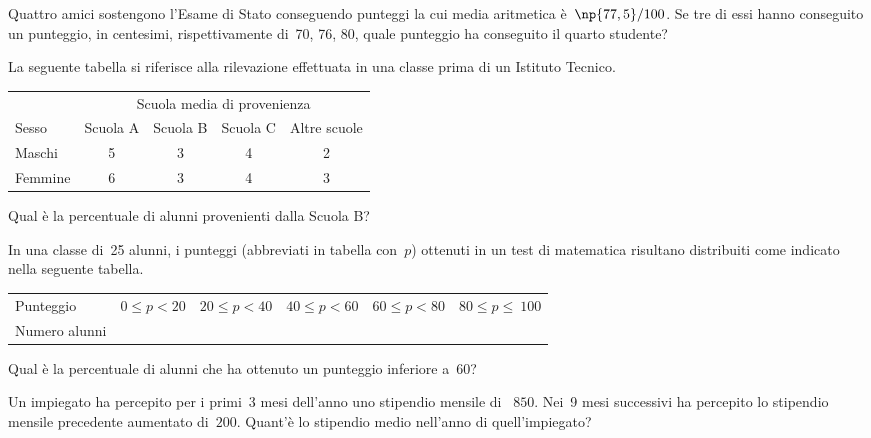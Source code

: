 \begin{esercizio}
\label{ese:A.51}
Quattro amici sostengono l'Esame di Stato conseguendo punteggi la cui media aritmetica è~$\np{77,5}/100$.
Se tre di essi hanno conseguito un punteggio, in centesimi, rispettivamente di~70, 76, 80, quale punteggio ha conseguito il quarto studente?
\end{esercizio}
\pagebreak
\begin{esercizio}
\label{ese:A.52}
La seguente tabella si riferisce alla rilevazione effettuata in una classe prima di un Istituto Tecnico.
\begin{center}
 \begin{tabular}{l*{4}{c}}
\toprule
 & \multicolumn{4}{c}{Scuola media di provenienza}\\
Sesso & Scuola A & Scuola B & Scuola C & Altre scuole\\
\midrule
Maschi & 5 & 3 & 4 & 2 \\
Femmine & 6 & 3 & 4 & 3 \\
\bottomrule
\end{tabular}
\end{center}
Qual è la percentuale di alunni provenienti dalla Scuola B?
\end{esercizio}

\begin{esercizio}
\label{ese:A.53}
In una classe di~25 alunni, i punteggi (abbreviati in tabella con~$p$) ottenuti in un test di matematica risultano distribuiti come indicato nella seguente tabella.
\begin{center}
 \begin{tabular}{l*{5}{c}}
\toprule
Punteggio & $0 \leq p < 20$ & $20 \leq p < 40$ & $40 \leq p < 60$ & $60 \leq p < 80$ & $80 \leq p \leq~100$ \\
Numero alunni & & & & & \\
\bottomrule
\end{tabular}
\end{center}
Qual è la percentuale di alunni che ha ottenuto un punteggio inferiore a~60?
\end{esercizio}

\begin{esercizio}
\label{ese:A.54}
Un impiegato ha percepito per i primi~3 mesi dell'anno uno stipendio mensile di \officialeuro~$850$. Nei~9 mesi successivi ha percepito
lo stipendio mensile precedente aumentato di\officialeuro~$200$. Quant'è lo stipendio medio nell'anno di quell'impiegato?
\end{esercizio}

